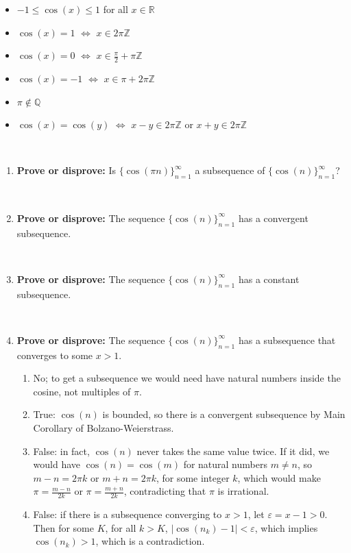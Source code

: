 \documentclass[12pt]{amsart}
\def\e{\varepsilon}
\newcommand{\Q}{\mathbb{Q}}
\newcommand{\R}{{\mathbb{R}}}
\newcommand{\Z}{\mathbb{Z}}
\numberwithin{equation}{section}
\theoremstyle{plain} %
\theoremstyle{definition}
\theoremstyle{remark}
\begin{document}
{ \hrulefill
\begin{multicols}{2}
\footnotesize
\begin{itemize}
\item $-1 \leq \cos(x) \leq 1$ for all $x\in \R$
\item $\cos(x) = 1$ $\Longleftrightarrow$ $x\in 2\pi \Z$ 
\item $\cos(x) = 0$ $\Longleftrightarrow$ $x\in \frac{\pi}{2} + \pi \Z$ 
\item $\cos(x) = -1$ $\Longleftrightarrow$ $x\in \pi + 2\pi \Z$
\item $\pi \notin \Q$
\item $\cos(x) = \cos(y)$ $\Longleftrightarrow$ $x-y\in 2\pi \Z$ or $x+y\in 2\pi \Z$

\end{itemize}
\end{multicols}
}


\

\begin{enumerate}
\item \textbf{Prove or disprove:} Is $\{ \cos( \pi n) \}_{n=1}^\infty$ a subsequence of $\{ \cos(n) \}_{n=1}^\infty$?

\

\item \textbf{Prove or disprove:} The sequence $\{ \cos(n) \}_{n=1}^\infty$ has a convergent subsequence.

\

\item \textbf{Prove or disprove:} The sequence $\{ \cos(n) \}_{n=1}^\infty$ has a constant subsequence.

\

\item \textbf{Prove or disprove:} The sequence $\{ \cos(n) \}_{n=1}^\infty$ has a subsequence that converges to some $x>1$.

\begin{framed}
\begin{enumerate}
\item No; to get a subsequence we would need have natural numbers inside the cosine, not multiples of $\pi$.
\item True: $\cos(n)$ is bounded, so there is a convergent subsequence by Main Corollary of Bolzano-Weierstrass.
\item False: in fact, $\cos(n)$ never takes the same value twice. If it did, we would have $\cos(n)=\cos(m)$ for natural numbers $m\neq n$, so $m-n= 2\pi k$ or $m+n= 2\pi k$, for some integer $k$, which would make $\pi = \frac{m-n}{2k}$ or $\pi = \frac{m+n}{2k}$, contradicting that $\pi$ is irrational.
\item False: if there is a subsequence converging to $x>1$, let $\e= x-1 >0$. Then for some $K$, for all $k>K$, $|\cos(n_k) -1|<\e$, which implies $\cos(n_k) >1$, which is a contradiction.
\end{enumerate}
\end{framed}
\end{enumerate}
\end{document}
